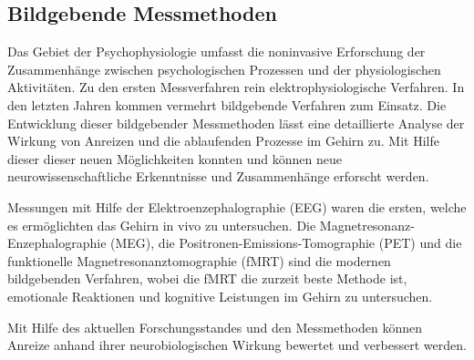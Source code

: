 \subsection{Bildgebende Messmethoden}
Das Gebiet der Psychophysiologie umfasst die noninvasive Erforschung der Zusammenhänge zwischen psychologischen Prozessen und der physiologischen Aktivitäten. Zu den ersten Messverfahren rein elektrophysiologische Verfahren. In den letzten Jahren kommen vermehrt bildgebende Verfahren zum Einsatz. \citep[S. 232]{Kirschbaum.2008}
Die Entwicklung dieser bildgebender Messmethoden lässt eine detaillierte Analyse der Wirkung von Anreizen und die ablaufenden Prozesse im Gehirn  zu. Mit Hilfe dieser dieser neuen Möglichkeiten konnten und können neue neurowissenschaftliche Erkenntnisse und Zusammenhänge erforscht werden. \citep[S. 15]{Nowka.2013}
 
Messungen mit Hilfe der Elektroenzephalographie (EEG) waren die ersten, welche es ermöglichten das Gehirn in vivo zu untersuchen. \citep[S. 43]{Weber.2011}  Die Magnetresonanz-Enzephalographie (MEG), die Positronen-Emissions-Tomographie (PET)  und die funktionelle Magnetresonanztomographie (fMRT) sind die modernen bildgebenden Verfahren, wobei die fMRT die zurzeit beste Methode ist, emotionale Reaktionen und kognitive Leistungen im Gehirn zu untersuchen. \citep[S. 50]{Weber.2011}
 
Mit Hilfe des aktuellen Forschungsstandes und den \glqq Messmethoden können Anreize anhand ihrer neurobiologischen Wirkung bewertet und verbessert werden.\grqq \citep[S. 17]{Nowka.2013}